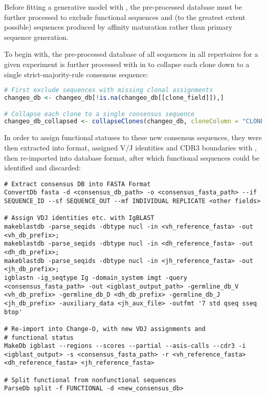
Before fitting a generative model with , the pre-processed  database must be further processed to exclude functional sequences and (to the greatest extent possible) sequences produced by affinity maturation rather than primary sequence generation.

To begin with, the pre-processed  database of all sequences in all repertoires for a given experiment is further processed with  \parencite{gupta2015changeo} in  to collapse each clone down to a single strict-majority-rule consensus sequence:

\begin{lstlisting}[language=R]
# First exclude sequences with missing clonal assignments
changeo_db <- changeo_db[!is.na(changeo_db[[clone_field]]),]

# Collapse each clone to a single consensus sequence
changeo_db_collapsed <- collapseClones(changeo_db, cloneColumn = "CLONE", sequenceColumn = "SEQUENCE_IMGT", germlineColumn = "GERMLINE_IMGT_D_MASK", method = "mostCommon", includeAmbiguous = FALSE, breakTiesStochastic = FALSE, expandedDb = NULL)
\end{lstlisting}

\noindent In order to assign functional statuses to these new consensus sequences, they were then extracted into  format, assigned V/J identities and CDR3 boundaries with , then re-imported into  database format, after which functional sequences could be identified and discarded:

\begin{lstlisting}
# Extract consensus DB into FASTA Format
ConvertDb fasta -d <consensus_db_path> -o <consensus_fasta_path> --if SEQUENCE_ID --sf SEQUENCE_OUT --mf INDIVIDUAL REPLICATE <other fields> 

# Assign VDJ identities etc. with IgBLAST
makeblastdb -parse_seqids -dbtype nucl -in <vh_reference_fasta> -out <vh_db_prefix>;
makeblastdb -parse_seqids -dbtype nucl -in <dh_reference_fasta> -out <dh_db_prefix>;
makeblastdb -parse_seqids -dbtype nucl -in <jh_reference_fasta> -out <jh_db_prefix>;
igblastn -ig_seqtype Ig -domain_system imgt -query <consensus_fasta_path> -out <igblast_output_path> -germline_db_V <vh_db_prefix> -germline_db_D <dh_db_prefix> -germline_db_J <jh_db_prefix> -auxiliary_data <jh_aux_file> -outfmt '7 std qseq sseq btop'

# Re-import into Change-O, with new VDJ assignments and
# functional status
MakeDb igblast --regions --scores --partial --asis-calls --cdr3 -i <igblast_output> -s <consensus_fasta_path> -r <vh_reference_fasta> <dh_reference_fasta> <jh_reference_fasta>

# Split functional from nonfunctional sequences
ParseDb split -f FUNCTIONAL -d <new_consensus_db>
\end{lstlisting}

